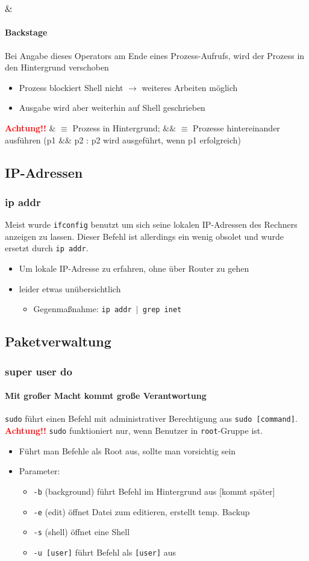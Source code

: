 \documentclass[12pt,utf8]{beamer}
\begin{document}
\begin{frame}
\frametitle{$\&$}
\framesubtitle{Backstage}
Bei Angabe dieses Operators am Ende eines Prozess-Aufrufs, wird der Prozess in den Hintergrund verschoben
\begin{itemize}
	\item Prozess blockiert Shell nicht $\to$ weiteres Arbeiten möglich
	\item Ausgabe wird aber weiterhin auf Shell geschrieben
\end{itemize}
\textbf{\textcolor{red}{Achtung!!}} $\&$ $\equiv$ Prozess in Hintergrund; $\&\&$ $\equiv$ Prozesse hintereinander ausführen (p1 $\&\&$ p2 : p2 wird ausgeführt, wenn p1 erfolgreich)
\end{frame}

\subsection{IP-Adressen}
\begin{frame}
	\frametitle{ip addr}
	Meist wurde \texttt{ifconfig} benutzt um sich seine lokalen IP-Adressen des Rechners anzeigen zu lassen. Dieser Befehl ist allerdings ein wenig obsolet und wurde ersetzt durch \texttt{ip addr}.
	\begin{itemize}
		\item Um lokale IP-Adresse zu erfahren, ohne über Router zu gehen
		\item leider etwas unübersichtlich
		\begin{itemize}
			\item {\scriptsize Gegenmaßnahme: \texttt{ip addr $\mid$ grep inet}}
		\end{itemize}
	\end{itemize}
\end{frame}

\subsection{Paketverwaltung}
\begin{frame}
	\frametitle{super user do}
	\framesubtitle{Mit großer Macht kommt große Verantwortung}
	\texttt{sudo} führt einen Befehl mit administrativer Berechtigung aus \texttt{sudo [command]}.
	\textbf{\textcolor{red}{Achtung!!}} \texttt{sudo} funktioniert nur, wenn Benutzer in \texttt{root}-Gruppe ist.
	\begin{itemize}
		\item Führt man Befehle als Root aus, sollte man vorsichtig sein
		\item Parameter:
		\begin{itemize}[<+->]
			\item {\scriptsize \texttt{-b} (background) führt Befehl im Hintergrund aus [kommt später]}
			\item {\scriptsize \texttt{-e} (edit) öffnet Datei zum editieren, erstellt temp. Backup}
			\item {\scriptsize \texttt{-s} (shell) öffnet eine Shell}
			\item {\scriptsize \texttt{-u [user]} führt Befehl als \texttt{[user]} aus}
		\end{itemize}
	\end{itemize}
\end{frame}
\end{document}
